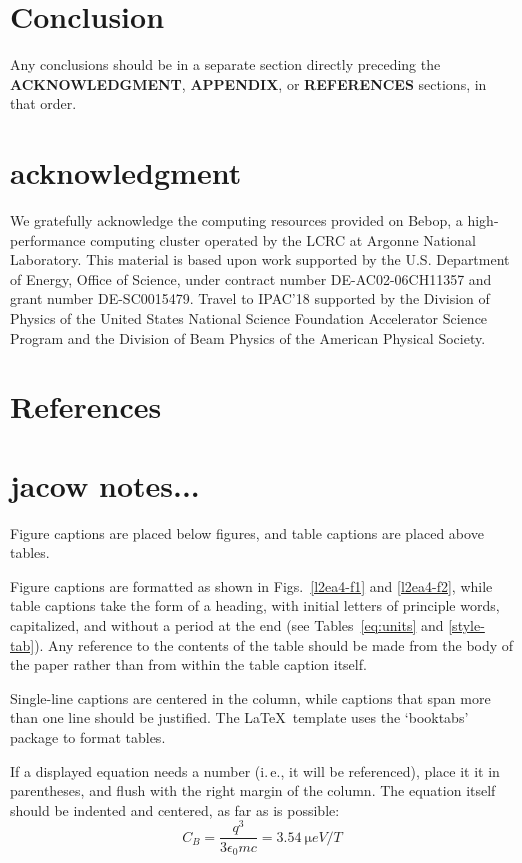 \documentclass[letterpaper,  %
              ]{jacow-2_3}   %
\newcommand\SEC[1]{\textbf{\uppercase{#1}}}
\begin{document}
\section{Conclusion}
Any conclusions should be in a separate section directly preceding
the \SEC{Acknowledgment}, \SEC{Appendix}, or \SEC{References} sections, in that
order.

\section{acknowledgment}
We gratefully acknowledge the computing resources
provided on Bebop, a high-performance computing cluster
operated by the LCRC at Argonne National Laboratory.
This material is based upon work supported by the 
U.S. Department of Energy, Office of Science, under 
contract number DE-AC02-06CH11357 and grant number DE-SC0015479. 
Travel to IPAC'18 supported by the Division of Physics 
of the United States National Science Foundation 
Accelerator Science Program and the Division of 
Beam Physics of the American Physical Society.

\section{References}
\iffalse  %
\newpage
\printbibliography

\else

\section{jacow notes...}
Figure captions are placed below figures, and table
captions are placed above tables.

Figure captions are formatted as shown in Figs.~\ref{l2ea4-f1} and \ref{l2ea4-f2},
while table captions take the form of a heading,
with initial letters of principle words, capitalized, and
without a period at the end (see Tables~\ref{eq:units} and \ref{style-tab}).
Any reference to the contents of the table should be made from
the body of the paper rather than from within the table
caption itself.

 Single-line captions are centered in the column, while captions
that span more than one line should be justified.
The \LaTeX\ template uses the ‘booktabs’ package to
format tables.

If a displayed equation needs a number (i.\,e., it will be
referenced), place it it in parentheses, and flush with the
right margin of the column. The equation itself should be
indented and centered, as far as is possible:
\begin{equation}\label{eq:units}
    C_B=\frac{q^3}{3\epsilon_{0} mc}=\SI{3.54}{\micro eV/T}
\end{equation}
\end{document}
